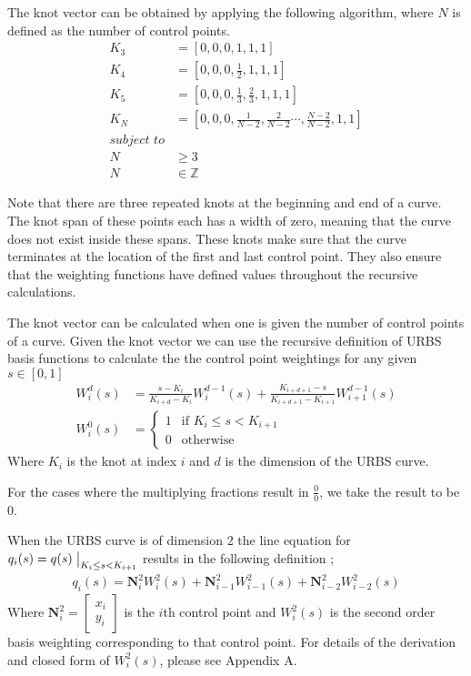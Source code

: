 The knot vector can be obtained by applying the following algorithm, where $N$ is defined as the number of control points.
\begin{align*}
K_3 &= \left[0, 0, 0, 1, 1, 1\right]\\  
K_4 &= \left[0, 0, 0, \frac{1}{2}, 1, 1, 1\right]\\  
K_5 &= \left[0, 0, 0, \frac{1}{3}, \frac{2}{3}, 1, 1, 1\right]\\
K_N &= \left[0, 0, 0, \frac{1}{N-2},\frac{2}{N-2} \cdots ,\frac{N-2}{N-2}, 1, 1\right]\\  
\textit{subject to}\\
N &\geq 3\\
N &\in \mathbb{Z}
\end{align*}

Note that there are three repeated knots at the beginning and end of a curve. The knot span of these points each has a width of zero, meaning that the curve does not exist inside these spans. These knots make sure that the curve terminates at the location of the first and last control point. They also ensure that the weighting functions have defined values throughout the recursive calculations.

The knot vector can be calculated when one is given the number of control points of a curve. Given the knot vector we can use the recursive definition of URBS basis functions to calculate the the control point weightings for any given $s \in [0, 1]$
\begin{align*}
W_{i}^d(s) &=   \frac{s - K_i}{K_{i+d} - K_i}W_{i}^{d-1}(s)  +  \frac{K_{i + d + 1} - s}{K_{i + d + 1} - K_{i+1}}W_{i+1}^{d-1}(s)\\
W_{i}^0(s) &= \begin{cases}
   1 & \text{if } K_i \leq s < K_{i+1} \\
   0 & \text{otherwise}
  \end{cases}
\end{align*}
Where $K_i$ is the knot at index $i$ and $d$ is the dimension of the URBS curve.

For the cases where the multiplying fractions result in $\frac{0}{0}$, we take the result to be $0$.

When the URBS curve is of dimension 2 the line equation for $q_i(s) = q(s)\bigm|_{K_i \leq s < K_{i+1}}$ results in the following definition \cite{website:nurbsExplain};
\begin{align*}
q_i(s) = \textbf{N}_i^2W_{i}^{2}(s) + \textbf{N}_{i-1}^2W_{i-1}^{2}(s) + \textbf{N}_{i-2}^2W_{i-2}^{2}(s)
\end{align*}
Where $\textbf{N}_i^2 = \begin{bmatrix}
x_i\\y_i
\end{bmatrix}$ is the $i$th control point and $W_{i}^{2}(s)$ is the second order basis weighting corresponding to that control point. 
For details of the derivation and closed form of $W_{i}^{2}(s)$, please see Appendix A.

